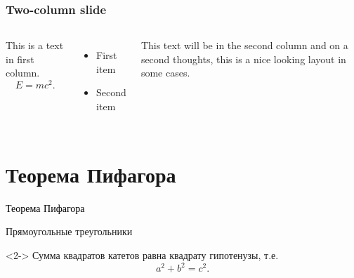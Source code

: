 \documentclass[nooutline]{../cmcbeamer}
\begin{document}
\begin{frame}
\frametitle{Two-column slide}
\begin{columns}

  This is a text in first column.
  \[
    E=mc^{2}.
  \]

  \begin{itemize}
  \item First item
  \item Second item
  \end{itemize}

  This text will be in the second column and on a second thoughts,
  this is a nice looking layout in some cases.
\end{columns}
\end{frame}

\section{Теорема Пифагора}\label{sec:thm-pif}

\begin{transitionframe}
  \begin{center}
    { \Huge \textcolor{black}{Теорема Пифагора}}
  \end{center}
\end{transitionframe}


\begin{frame}{Прямоугольные треугольники}
    \begin{theorem}<2->
      Сумма квадратов катетов равна квадрату гипотенузы, т.е.
      \begin{equation}
        \label{eq:thm-pif}
        a^2+b^2=c^2.
      \end{equation}
    \end{theorem}
\end{frame}
\end{document}
